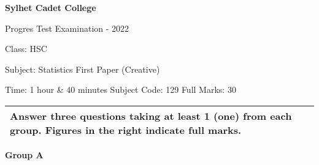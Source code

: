 \documentclass{article}
\begin{document}
\begin{center}
  \bfseries\large
  Sylhet Cadet College

\normalsize
  Progres Test Examination - 2022

  Class: HSC

  Subject: Statistics First Paper (Creative)

  Time: 1 hour \& 40 minutes \qquad \qquad \qquad Subject Code: 129  \qquad  \qquad \qquad Full Marks: 30

\end{center}

\noindent
\begin{tabular}{p{\dimexpr\linewidth-2\tabcolsep}}
  Answer three questions taking at least 1 (one) from each group. Figures in the right indicate full marks.\\
  \hline
\end{tabular}

\begin{center}
\textbf{Group A}
\end{center}
\end{document}
